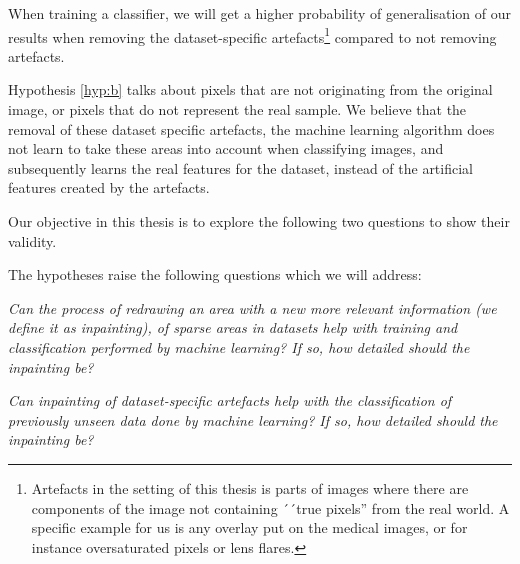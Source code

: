 \noindent 
\begin{hyp} \label{hyp:b}
When training a classifier, we will get a higher probability of generalisation of our results when removing the dataset-specific artefacts\footnote{Artefacts in the setting of this thesis is parts of images where there are components of the image not containing ´´true pixels'' from the real world. A specific example for us is any overlay put on the medical images, or for instance oversaturated pixels or lens flares.} compared to not removing artefacts.
\end{hyp}

\noindent
Hypothesis \ref{hyp:b} talks about pixels that are not originating from the original image, or pixels that do not represent the real sample. We believe that the removal of these dataset specific artefacts, the machine learning algorithm does not learn to take these areas into account when classifying images, and subsequently learns the real features for the dataset, instead of the artificial features created by the artefacts.


Our objective in this thesis is to explore the following two questions to show their validity.

The hypotheses raise the following questions which we will address:\\

\begin{que} \label{que:a}
\noindent \textit{Can the process of redrawing an area with a new more relevant information (we define it as inpainting), of sparse areas in datasets help with training and classification performed by machine learning? If so, how detailed should the inpainting be?}\\
\end{que}

\begin{que} \label{que:b}
\noindent \textit{Can inpainting of dataset-specific artefacts help with the classification of previously unseen data done by machine learning? If so, how detailed should the inpainting be?}
\end{que}

